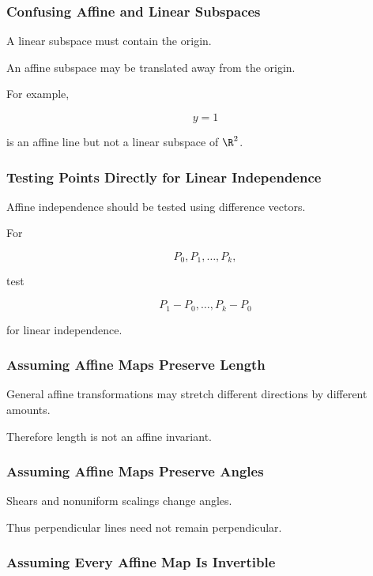 \subsubsection{Confusing Affine and Linear Subspaces}

A linear subspace must contain the origin.

An affine subspace may be translated away from the origin.

For example,

\[ y=1 \]

is an affine line but not a linear subspace of \(\R^2\).

\subsubsection{Testing Points Directly for Linear Independence}

Affine independence should be tested using difference vectors.

For

\[ P_0,P_1,\ldots,P_k, \]

test

\[ P_1-P_0,\ldots,P_k-P_0 \]

for linear independence.

\subsubsection{Assuming Affine Maps Preserve Length}

General affine transformations may stretch different directions by different
amounts.

Therefore length is not an affine invariant.

\subsubsection{Assuming Affine Maps Preserve Angles}

Shears and nonuniform scalings change angles.

Thus perpendicular lines need not remain perpendicular.

\subsubsection{Assuming Every Affine Map Is Invertible}

